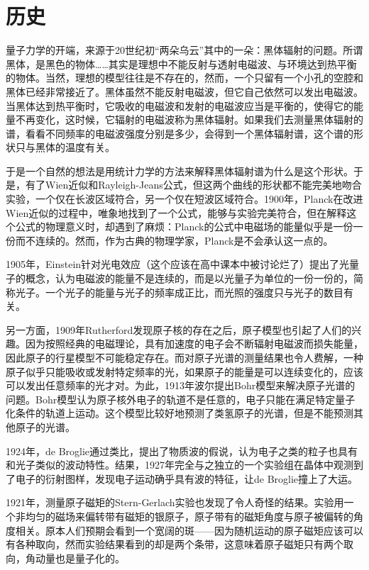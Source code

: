 \documentclass{ctexart}
\begin{document}
\section{历史}
量子力学的开端，来源于20世纪初“两朵乌云”其中的一朵：黑体辐射的问题。所谓黑体，是黑色的物体……其实是理想中不能反射与透射电磁波、与环境达到热平衡的物体。当然，理想的模型往往是不存在的，然而，一个只留有一个小孔的空腔和黑体已经非常接近了。黑体虽然不能反射电磁波，但它自己依然可以发出电磁波。当黑体达到热平衡时，它吸收的电磁波和发射的电磁波应当是平衡的，使得它的能量不再变化，这时候，它辐射的电磁波称为黑体辐射。如果我们去测量黑体辐射的谱，看看不同频率的电磁波强度分别是多少，会得到一个黑体辐射谱，这个谱的形状只与黑体的温度有关。

于是一个自然的想法是用统计力学的方法来解释黑体辐射谱为什么是这个形状。于是，有了Wien近似和Rayleigh-Jeans公式，但这两个曲线的形状都不能完美地吻合实验，一个仅在长波区域符合，另一个仅在短波区域符合。1900年，Planck在改进Wien近似的过程中，唯象地找到了一个公式，能够与实验完美符合，但在解释这个公式的物理意义时，却遇到了麻烦：Planck的公式中电磁场的能量似乎是一份一份而不连续的。然而，作为古典的物理学家，Planck是不会承认这一点的。

1905年，Einstein针对光电效应（这个应该在高中课本中被讨论烂了）提出了光量子的概念，认为电磁波的能量不是连续的，而是以光量子为单位的一份一份的，简称光子。一个光子的能量与光子的频率成正比，而光照的强度只与光子的数目有关。

另一方面，1909年Rutherford发现原子核的存在之后，原子模型也引起了人们的兴趣。因为按照经典的电磁理论，具有加速度的电子会不断辐射电磁波而损失能量，因此原子的行星模型不可能稳定存在。而对原子光谱的测量结果也令人费解，一种原子似乎只能吸收或发射特定频率的光，如果原子的能量是可以连续变化的，应该可以发出任意频率的光才对。为此，1913年波尔提出Bohr模型来解决原子光谱的问题。Bohr模型认为原子核外电子的轨道不是任意的，电子只能在满足特定量子化条件的轨道上运动。这个模型比较好地预测了类氢原子的光谱，但是不能预测其他原子的光谱。

1924年，de Broglie通过类比，提出了物质波的假说，认为电子之类的粒子也具有和光子类似的波动特性。结果，1927年完全与之独立的一个实验组在晶体中观测到了电子的衍射图样，发现电子运动确乎具有波的特征，让de Broglie撞上了大运。

1921年，测量原子磁矩的Stern-Gerlach实验也发现了令人奇怪的结果。实验用一个非均匀的磁场来偏转带有磁矩的银原子，原子带有的磁矩角度与原子被偏转的角度相关。原本人们预期会看到一个宽阔的斑——因为随机运动的原子磁矩应该可以有各种取向，然而实验结果看到的却是两个条带，这意味着原子磁矩只有两个取向，角动量也是量子化的。
\end{document}
